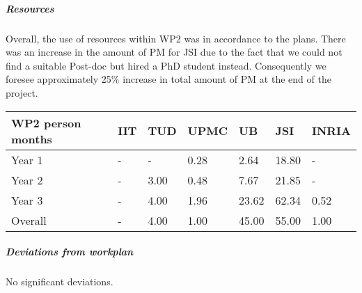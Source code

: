 
\subparagraph*{Resources}
Overall, the use of resources within WP2 was in accordance to the plans. There was an increase in the amount of PM for JSI due to the fact that we could not find a suitable Post-doc but hired a PhD student instead. Consequently we foresee approximately 25\% increase in total amount of PM at the end of the project.

\begin{center}
\begin{tabular}{|C{1.5cm}|C{1.5cm}|C{1.5cm}|C{2cm}|C{2cm}|C{2cm}|C{2cm}|}
\hline
\footnotesize \textbf{WP2 person months}& \footnotesize \textbf{IIT}&\footnotesize \textbf{TUD}&\footnotesize \textbf{UPMC}& \footnotesize \textbf{UB} &\footnotesize \textbf{JSI} & \footnotesize \textbf{INRIA} \\ \hline
\footnotesize Year 1 &  -     & - & 0.28 & 2.64 & 18.80  &-  \\  \hline
\footnotesize Year 2 &  -     & 3.00 & 0.48 & 7.67 & 21.85  &-  \\  \hline
\footnotesize Year 3 &  - & 4.00 & 1.96 & 23.62 & 62.34 & 0.52  \\ 
\hline \hline
\footnotesize Overall & -     & 4.00 & 1.00 & 45.00 & 55.00 & 1.00 \\ \hline
\end{tabular}
\end{center}

\subparagraph*{Deviations from workplan} 
No significant deviations.

